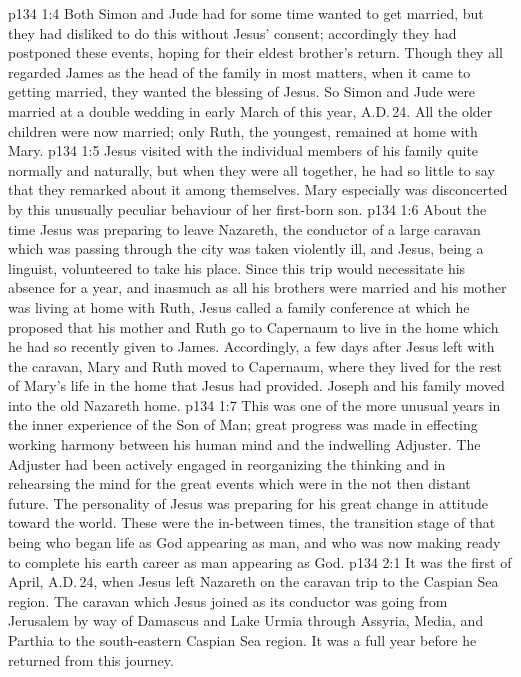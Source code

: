 \vs p134 1:4 Both Simon and Jude had for some time wanted to get married, but they had disliked to do this without Jesus’ consent; accordingly they had postponed these events, hoping for their eldest brother’s return. Though they all regarded James as the head of the family in most matters, when it came to getting married, they wanted the blessing of Jesus. So Simon and Jude were married at a double wedding in early March of this year, A.D.\,24. All the older children were now married; only Ruth, the youngest, remained at home with Mary.
\vs p134 1:5 Jesus visited with the individual members of his family quite normally and naturally, but when they were all together, he had so little to say that they remarked about it among themselves. Mary especially was disconcerted by this unusually peculiar behaviour of her first\hyp{}born son.
\vs p134 1:6 About the time Jesus was preparing to leave Nazareth, the conductor of a large caravan which was passing through the city was taken violently ill, and Jesus, being a linguist, volunteered to take his place. Since this trip would necessitate his absence for a year, and inasmuch as all his brothers were married and his mother was living at home with Ruth, Jesus called a family conference at which he proposed that his mother and Ruth go to Capernaum to live in the home which he had so recently given to James. Accordingly, a few days after Jesus left with the caravan, Mary and Ruth moved to Capernaum, where they lived for the rest of Mary’s life in the home that Jesus had provided. Joseph and his family moved into the old Nazareth home.
\vs p134 1:7 This was one of the more unusual years in the inner experience of the Son of Man; great progress was made in effecting working harmony between his human mind and the indwelling Adjuster. The Adjuster had been actively engaged in reorganizing the thinking and in rehearsing the mind for the great events which were in the not then distant future. The personality of Jesus was preparing for his great change in attitude toward the world. These were the in\hyp{}between times, the transition stage of that being who began life as God appearing as man, and who was now making ready to complete his earth career as man appearing as God.
\vs p134 2:1 It was the first of April, A.D.\,24, when Jesus left Nazareth on the caravan trip to the Caspian Sea region. The caravan which Jesus joined as its conductor was going from Jerusalem by way of Damascus and Lake Urmia through Assyria, Media, and Parthia to the south\hyp{}eastern Caspian Sea region. It was a full year before he returned from this journey.
